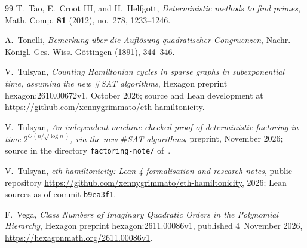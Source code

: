 \documentclass[10pt]{amsart}
\theoremstyle{plain}
\theoremstyle{definition}
\theoremstyle{remark}
\numberwithin{equation}{section}
\begin{document}
\begin{thebibliography}{99}
T.~Tao, E.~Croot III, and H.~Helfgott, \emph{Deterministic methods to find primes}, Math. Comp. \textbf{81}
(2012), no.~278, 1233--1246.

A.~Tonelli, \emph{Bemerkung \"uber die Aufl\"osung quadratischer Congruenzen}, Nachr. K\"onigl. Ges. Wiss.
G\"ottingen (1891), 344--346.

V.~Tulsyan, \emph{Counting {H}amiltonian cycles in sparse graphs in subexponential time, assuming the
new $\#${SAT} algorithms}, Hexagon preprint hexagon:2610.00672v1, October 2026; source and Lean
development at \url{https://github.com/xennygrimmato/eth-hamiltonicity}.

V.~Tulsyan, \emph{An independent machine-checked proof of deterministic factoring in time
$2^{O(n/\sqrt{\log n})}$, via the new $\#${SAT} algorithms}, preprint, November 2026; source in the
directory \texttt{factoring-note/} of~\cite{TulsyanRepo26}.

V.~Tulsyan, \emph{eth-hamiltonicity: {L}ean 4 formalisation and research notes}, public repository
\url{https://github.com/xennygrimmato/eth-hamiltonicity}, 2026; Lean sources as of commit \texttt{b9ea3f1}.

F.~Vega, \emph{Class {N}umbers of {I}maginary {Q}uadratic {O}rders in the {P}olynomial {H}ierarchy}, Hexagon
preprint hexagon:2611.00086v1, published 4~November 2026, \url{https://hexagonmath.org/2611.00086v1}.

\end{thebibliography}
\end{document}
